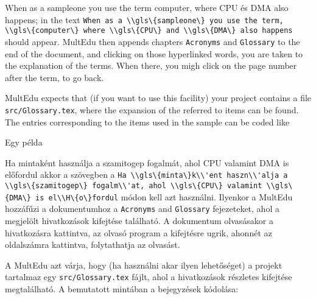{

When as a \gls{sampleone} you use the term \gls{computer},
where \gls{CPU} és \gls{DMA} also happens;
in the text \lstinline|When as a \\gls\{sampleone\} you use the term, \\gls\{computer\} where \\gls\{CPU\} and \\gls\{DMA\} also happens| should appear. \gls{MultEdu} then appends chapters \lstinline|Acronyms| and \lstinline|Glossary| to the end of the document, and clicking on those hyperlinked words, you are taken
to the explanation of the terms. When there, you migh click on the page number after the term, to go back.

\gls{MultEdu} expects that (if you want to use this facility) your project
contains a file \lstinline|src/Glossary.tex|, where the expansion
of the referred to items can be found. The entries corresponding 
to the items used in the sample can be coded like
}
{Egy példa}
{

Ha \gls{minta}ként használja a \gls{szamitogep} fogalmát,
ahol \gls{CPU} valamint \gls{DMA} is előfordul
akkor a szövegben a \lstinline|Ha \\gls\{minta\}k\\'ent haszn\\'alja a \\gls\{szamitogep\} fogalm\\'at,
ahol \\gls\{CPU\} valamint \\gls\{DMA\} is el\\H\{o\}fordul|
módon kell azt használni.
Ilyenkor a \gls{MultEdu} hozzáfűzi a dokumentumhoz a \lstinline|Acronyms| and \lstinline|Glossary| fejezeteket, ahol a megjelölt hivatkozások kifejtése 
található. A dokumentum olvasásakor a hivatkozásra kattintva, az olvasó 
program a kifejtésre ugrik, ahonnét az oldalszámra kattintva, folytathatja
az olvasást.

A \gls{MultEdu} azt várja, hogy (ha használni akar ilyen lehetőséget) a projekt
tartalmaz egy \lstinline|src/Glossary.tex| fájlt,
ahol a hivatkozások részletes kifejtése megtalálható.
A bemutatott mintában a bejegyzések kódolása:

}




